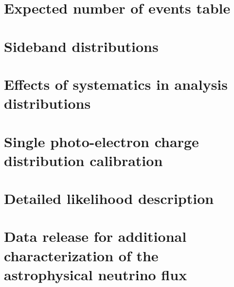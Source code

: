 \documentclass[oneside, letterpaper, 10pt, oldfontcommands]{memoir}
\begin{document}
\section{Expected number of events table\label{sec:events_table}}

\section{Sideband distributions\label{sec:sidebands}}

\section{Effects of systematics in analysis distributions\label{sec:extendedsys}}

\section{Single photo-electron charge distribution calibration\label{sec:charge_calibration}}

\section{Detailed likelihood description\label{sec:likelihood}}

\section{Data release for additional characterization of the astrophysical neutrino flux\label{sec:release}}

\endgroup
\end{document}
